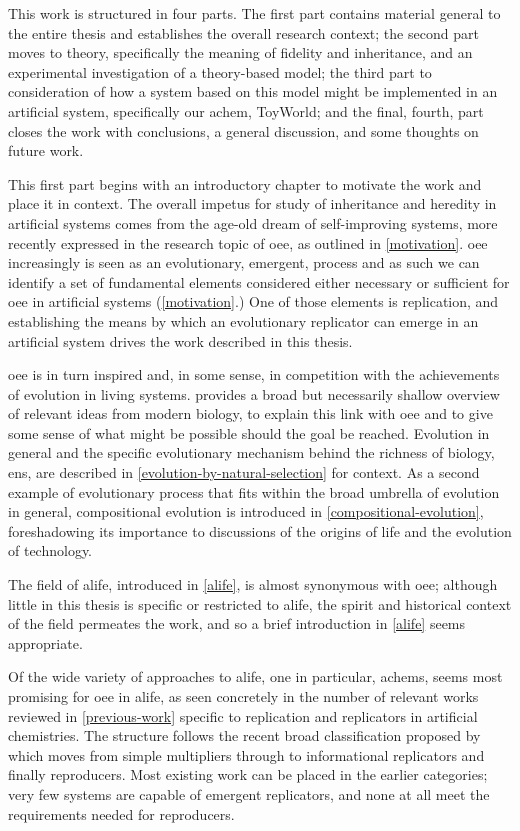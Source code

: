 This work is structured in four parts. The first part contains material general to the entire thesis and establishes the overall research context; the second part moves to theory, specifically the meaning of fidelity and inheritance, and an experimental investigation of a theory-based model; the third part to consideration of how a system based on this model might be implemented in an artificial system, specifically our \gls{achem}, ToyWorld; and the final, fourth, part closes the work with conclusions, a general discussion, and some thoughts on future work.

This first part begins with an introductory chapter to motivate the work and place it in context. The overall impetus for study of inheritance and heredity in artificial systems comes from the age-old dream of self-improving systems, more recently expressed in the research topic of \gls{oee}, as outlined in \cref{motivation}. \Gls{oee} increasingly is seen as an evolutionary, emergent, process and as such we can identify a set of fundamental elements considered either necessary or sufficient for \gls{oee} in artificial systems (\cref{motivation}.) One of those elements is replication, and establishing the means by which an evolutionary replicator can emerge in an artificial system drives the work described in this thesis.

\Gls{oee} is in turn inspired and, in some sense, in competition with the achievements of evolution in living systems.  provides a broad but necessarily shallow overview of relevant ideas from modern biology, to explain this link with \gls{oee} and to give some sense of what might be possible should the goal be reached. Evolution in general and the specific evolutionary mechanism behind the richness of biology, \gls{ens}, are described in \cref{evolution-by-natural-selection} for context. As a second example of evolutionary process that fits within the broad umbrella of evolution in general, compositional evolution is introduced in \cref{compositional-evolution}, foreshadowing its importance to discussions of the origins of life and the evolution of technology.

The field of \gls{alife}, introduced in \cref{alife}, is almost synonymous with \gls{oee}; although little in this thesis is specific or restricted to \gls{alife}, the spirit and historical context of the field permeates the work, and so a brief introduction in \cref{alife} seems appropriate. 

Of the wide variety of approaches to \gls{alife}, one in particular, \glspl{achem}, seems most promising for \gls{oee} in \gls{alife}, as seen concretely in the number of relevant works reviewed in \cref{previous-work} specific to replication and replicators in artificial chemistries. The structure follows the recent broad classification proposed by \cite{Zachar2010} which moves from simple multipliers through to informational replicators and finally reproducers. Most existing work can be placed in the earlier categories; very few systems are capable of emergent replicators, and none at all meet the requirements needed for reproducers.

